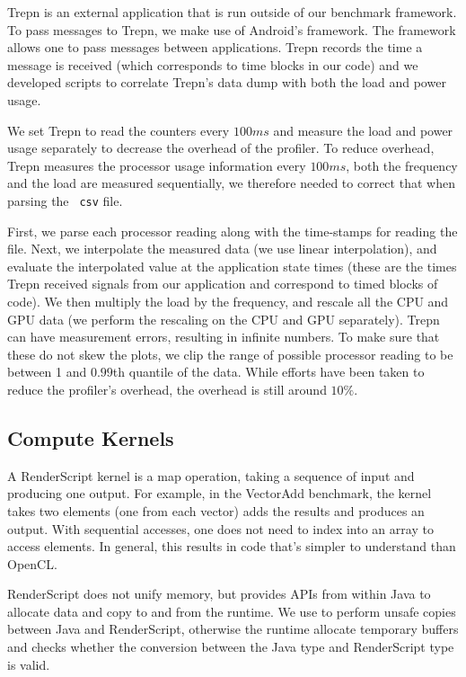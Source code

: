 Trepn is an external application that is run outside of our benchmark framework.
To pass messages to Trepn, we make use of Android's  framework.
The  framework allows one to pass messages between applications.
Trepn records the time a message is received (which corresponds to time blocks
in our code) and we developed scripts to correlate Trepn's data dump with both
the load and power usage.

We set Trepn to read
the counters every $100ms$ and measure the load and power usage separately to
decrease the overhead of the profiler.  To reduce overhead, Trepn measures the
processor usage information every $100ms$, both the frequency and the load are
measured sequentially, we therefore needed to correct that when parsing the {\tt
csv} file.

First, we parse each processor reading along with the time-stamps for reading the
file.  Next, we interpolate the measured data (we use linear interpolation), and
evaluate the interpolated value at the application state times (these are the times
Trepn received signals from our application and correspond to timed blocks of
code).  We then multiply the load by the frequency, and rescale all the CPU and
GPU data (we perform the rescaling on the CPU and GPU separately).  Trepn can
have measurement errors, resulting in infinite numbers.  To make sure that these
do not skew the plots, we clip the range of possible processor reading to be
between 1 and $0.99$th quantile of the data.  While efforts have
been taken to reduce the profiler's overhead, the overhead is still around
$10\%$.

\subsection{Compute Kernels}

A RenderScript kernel is a map operation, taking a sequence of input and producing one output. For example, in
the VectorAdd benchmark, the kernel takes two elements (one from each vector) adds the results and produces an output.
With sequential accesses, one does not need to index into an array to access elements. In general, this results in code that's simpler to understand than OpenCL. 

RenderScript does not unify memory, but provides APIs from within Java to allocate data and copy to and from the runtime. 
We use  to perform unsafe copies between Java and RenderScript, otherwise the runtime allocate temporary buffers and checks whether the conversion between the Java type and RenderScript type is valid.

